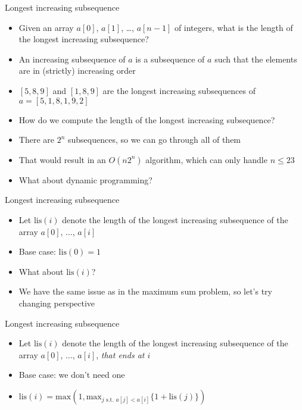 \begin{frame}[fragile]{Longest increasing subsequence}
    \begin{itemize}
\item Given an array $a[0]$, $a[1]$, \ldots, $a[n-1]$ of integers, what is the length of the longest increasing subsequence?
\item An increasing subsequence of $a$ is a subsequence of $a$ such that the elements are in (strictly) increasing order
\item $[5,8,9]$ and $[1,8,9]$ are the longest increasing subsequences of $a = [5,1,8,1,9,2]$
\item How do we compute the length of the longest increasing subsequence?
\item There are $2^n$ subsequences, so we can go through all of them
\item That would result in an $O(n2^n)$ algorithm, which can only handle $n\leq 23$
\item What about dynamic programming?

    \end{itemize}
\end{frame}

\begin{frame}[fragile]{Longest increasing subsequence}
    \begin{itemize}
\item Let $\mathrm{lis}(i)$ denote the length of the longest increasing subsequence of the array $a[0]$, $\ldots$, $a[i]$
\item Base case: $\mathrm{lis}(0) = 1$
\item What about $\mathrm{lis}(i)$?
\item We have the same issue as in the maximum sum problem, so let's try changing perspective
    \end{itemize}
\end{frame}

\begin{frame}[fragile]{Longest increasing subsequence}
    \begin{itemize}
\item Let $\mathrm{lis}(i)$ denote the length of the longest increasing subsequence of the array $a[0]$, $\ldots$, $a[i]$, \textit{that ends at $i$}
\item Base case: we don't need one
\item $\mathrm{lis}(i) = \mathrm{max}(1, \mathrm{max}_{j \textrm{ s.t. } a[j] < a[i]} \{ 1 + \mathrm{lis}(j) \})$
    \end{itemize}
\end{frame}

